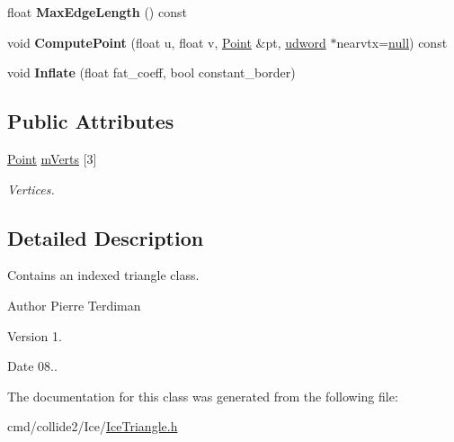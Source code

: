 \begin{DoxyCompactItemize}
\item 
float {\bfseries Max\+Edge\+Length} () const \hypertarget{classTriangle_a7a67fed5c72f72dff4153d53cca3bf17}{}\label{classTriangle_a7a67fed5c72f72dff4153d53cca3bf17}

\item 
void {\bfseries Compute\+Point} (float u, float v, \hyperlink{classPoint}{Point} \&pt, \hyperlink{IceTypes_8h_a44c6f1920ba5551225fb534f9d1a1733}{udword} $\ast$nearvtx=\hyperlink{IceTypes_8h_ac97b8ee753e4405397a42ad5799b0f9e}{null}) const \hypertarget{classTriangle_ab7e8470714c153103ad1c1d72841e0cf}{}\label{classTriangle_ab7e8470714c153103ad1c1d72841e0cf}

\item 
void {\bfseries Inflate} (float fat\+\_\+coeff, bool constant\+\_\+border)\hypertarget{classTriangle_a707f856524937c61b1ada90faf19685c}{}\label{classTriangle_a707f856524937c61b1ada90faf19685c}

\end{DoxyCompactItemize}
\subsection*{Public Attributes}
\begin{DoxyCompactItemize}
\item 
\hyperlink{classPoint}{Point} \hyperlink{classTriangle_a08015a93222f99844caad6aa1bacc990}{m\+Verts} \mbox{[}3\mbox{]}\hypertarget{classTriangle_a08015a93222f99844caad6aa1bacc990}{}\label{classTriangle_a08015a93222f99844caad6aa1bacc990}

\begin{DoxyCompactList}\small\item\em Vertices. \end{DoxyCompactList}\end{DoxyCompactItemize}


\subsection{Detailed Description}
Contains an indexed triangle class.

\begin{DoxyAuthor}{Author}
Pierre Terdiman 
\end{DoxyAuthor}
\begin{DoxyVersion}{Version}
1. 
\end{DoxyVersion}
\begin{DoxyDate}{Date}
08.. 
\end{DoxyDate}


The documentation for this class was generated from the following file\+:\begin{DoxyCompactItemize}
\item 
cmd/collide2/\+Ice/\hyperlink{IceTriangle_8h}{Ice\+Triangle.\+h}\end{DoxyCompactItemize}
